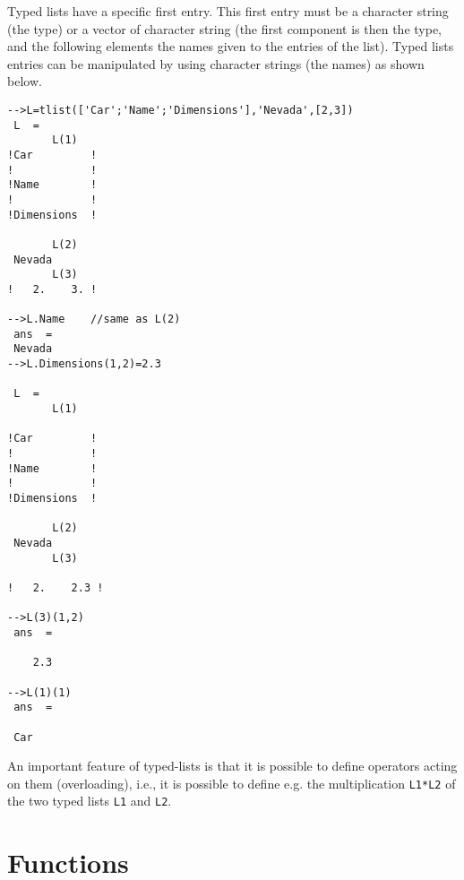 Typed lists have a specific first entry. This first entry must be a 
character string (the type) or a vector of character string (the first
component is then the type, and the following elements the names given
to the entries of the list). Typed lists entries can be manipulated
by using character strings (the names) as shown below.

\begin{verbatim}
-->L=tlist(['Car';'Name';'Dimensions'],'Nevada',[2,3])
 L  =
       L(1)
!Car         !
!            !
!Name        !
!            !
!Dimensions  !
 
       L(2)
 Nevada   
       L(3)
!   2.    3. !

-->L.Name    //same as L(2)
 ans  =
 Nevada   
-->L.Dimensions(1,2)=2.3

 L  =
       L(1)
 
!Car         !
!            !
!Name        !
!            !
!Dimensions  !
 
       L(2)
 Nevada   
       L(3)
 
!   2.    2.3 !

-->L(3)(1,2)
 ans  =
 
    2.3  

-->L(1)(1)
 ans  =
 
 Car
\end{verbatim}
An important feature of typed-lists is that it is possible to define
operators acting on them (overloading), i.e., it is possible
to define e.g. the multiplication \verb!L1*L2! of the two typed lists 
\verb!L1! and \verb!L2!. 


\section{Functions}
\label{s2.6}

